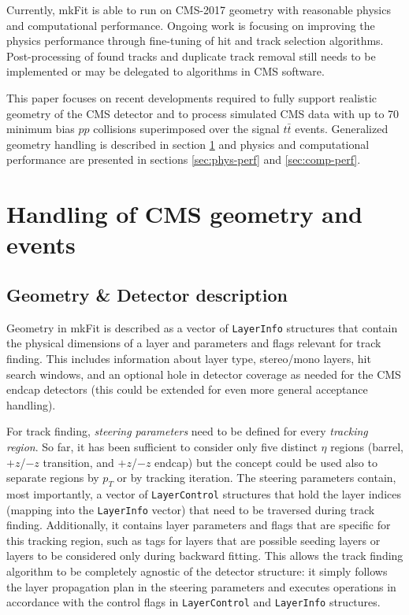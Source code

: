 \documentclass{webofc}
\def\mkfit{mkFit\xspace}
\def\stt#1{{\small\texttt{#1}}}
\begin{document}
Currently, \mkfit is able to run on CMS-2017 geometry with reasonable physics
and computational performance. Ongoing work is focusing on improving the
physics performance through fine-tuning of hit and track selection
algorithms. Post-processing of found tracks and duplicate track removal
still needs to be implemented or may be delegated to algorithms in CMS
software.

This paper focuses on recent developments required to fully support realistic
geometry of the CMS detector and to process simulated
CMS data with up to 70 minimum bias $pp$ collisions superimposed over the
signal $t\bar{t}$ events. Generalized geometry handling is described in
section \ref{sec:cms-geom-and-events} and physics and computational
performance are presented in sections \ref{sec:phys-perf} and
\ref{sec:comp-perf}.


\section{Handling of CMS geometry and events}
\label{sec:cms-geom-and-events}

\subsection{Geometry \& Detector description}

Geometry in \mkfit is described as a vector of \stt{LayerInfo} structures
that contain the physical dimensions of a layer and parameters
and flags relevant for track finding. This includes information about layer
type, stereo/mono layers, hit search windows, and an optional hole in detector
coverage as needed for the CMS endcap detectors (this could be extended for
even more general acceptance handling).

For track finding, \emph{steering parameters} need to be defined for every
\emph{tracking region}. So far, it has been sufficient to consider only five distinct $\eta$
regions (barrel, $+z$/$-z$ transition, and $+z$/$-z$ endcap) but the concept
could be used also to separate regions by $p_T$ or by tracking iteration. The
steering parameters contain, most importantly, a vector of \stt{LayerControl}
structures that hold the layer indices (mapping into the \stt{LayerInfo} vector)
that need to be traversed during track finding. Additionally, it contains
layer parameters and flags that are specific for this tracking region, such as
tags for layers that are possible seeding layers or layers to be considered only
during backward fitting. This allows the track finding algorithm to be completely
agnostic of the detector structure: it simply follows the layer propagation
plan in the steering parameters and executes operations in accordance with the
control flags in \stt{LayerControl} and \stt{LayerInfo} structures.
\end{document}
